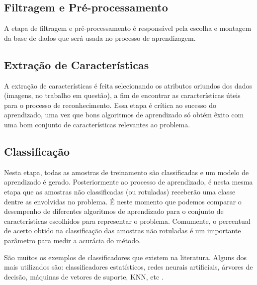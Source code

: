 
\subsection{Filtragem e Pré-processamento}

A etapa de filtragem e pré-processamento é responsável pela escolha e montagem da base de dados que será usada no processo de aprendizagem.


\subsection{Extração de Características}

A extração de características é feita selecionando os atributos oriundos dos dados (imagens, no trabalho em questão), a fim de encontrar as características úteis para o processo de reconhecimento. Essa etapa é crítica ao sucesso do aprendizado, uma vez que bons algoritmos de aprendizado só obtém êxito com uma bom conjunto de características relevantes ao problema.

\subsection{Classificação}\label{sec:classificacao}

Nesta etapa, todas as amostras de treinamento são classificadas e um modelo de aprendizado é gerado. Posteriormente ao processo de aprendizado, é nesta mesma etapa que as amostras não classificadas (ou rotuladas) receberão uma classe dentre as envolvidas no problema. É neste momento que podemos comparar o desempenho de diferentes algoritmos de aprendizado para o conjunto de características escolhidos para representar o problema. Comumente, o percentual de acerto obtido na classificação das amostras não rotuladas é um importante parâmetro para medir a acurácia do método.

São muitos os exemplos de classificadores que existem na literatura. Alguns dos mais utilizados são: classificadores estatísticos, redes neurais artificiais, árvores de decisão, máquinas de vetores de suporte, KNN, etc \cite{jain:1989}.

